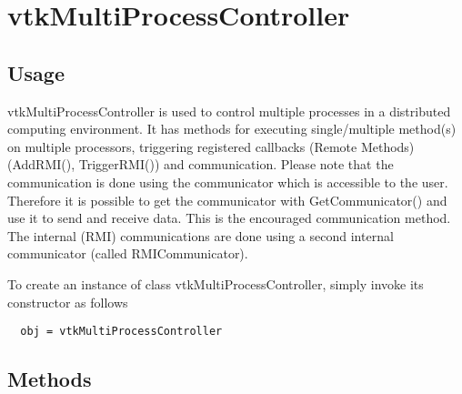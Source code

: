 \section{vtkMultiProcessController}

\subsection{Usage}

 vtkMultiProcessController is used to control multiple processes
 in a distributed computing environment. It has
 methods for executing single/multiple method(s) on multiple processors,
 triggering registered callbacks (Remote Methods) (AddRMI(), TriggerRMI())
 and communication. Please note that the communication is done using
 the communicator which is accessible to the user. Therefore it is
 possible to get the communicator with GetCommunicator() and use
 it to send and receive data. This is the encouraged communication method.
 The internal (RMI) communications are done using a second internal
 communicator (called RMICommunicator).


To create an instance of class vtkMultiProcessController, simply
invoke its constructor as follows
\begin{verbatim}
  obj = vtkMultiProcessController
\end{verbatim}
\subsection{Methods}

